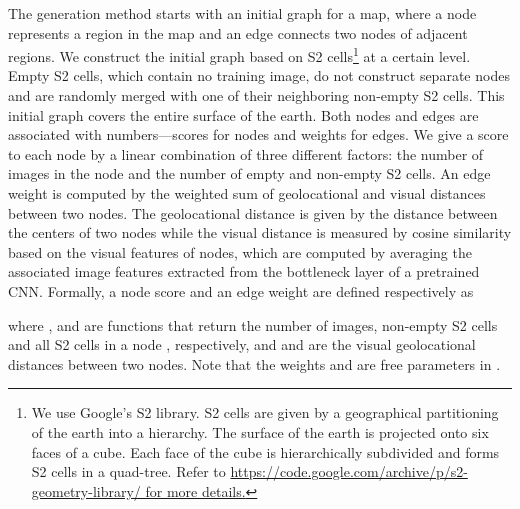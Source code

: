 \documentclass[runningheads]{llncs}
\begin{document}
The generation method starts with an initial graph for a map, where a node represents a region in the map and an edge connects two nodes of adjacent regions.
We construct the initial graph based on S2 cells\footnote{We use Google's S2 library. S2 cells are given by a geographical partitioning of the earth into a hierarchy. The surface of the earth is projected onto six faces of a cube. Each face of the cube is hierarchically subdivided and forms S2 cells in a quad-tree. Refer to \url{https://code.google.com/archive/p/s2-geometry-library/ for more details.}} at a certain level.
Empty S2 cells, which contain no training image, do not construct separate nodes and are randomly merged with one of their neighboring non-empty S2 cells.
This initial graph covers the entire surface of the earth.
Both nodes and edges are associated with numbers---scores for nodes and weights for edges.
We give a score to each node by a linear combination of three different factors: the number of images in the node and the number of empty and non-empty S2 cells.
An edge weight is computed by the weighted sum of geolocational and visual distances between two nodes.
The geolocational distance is given by the distance between the centers of two nodes while the visual distance is measured by cosine similarity based on the visual features of nodes, which are computed by averaging the associated image features extracted from the bottleneck layer of a pretrained CNN.
Formally, a node score  and an edge weight  are defined respectively as

where ,  and  are functions that return the number of images, non-empty S2 cells and all S2 cells in a node , respectively, and  and  are the visual geolocational distances between two nodes.
Note that the weights  and  are free parameters in .
\end{document}
